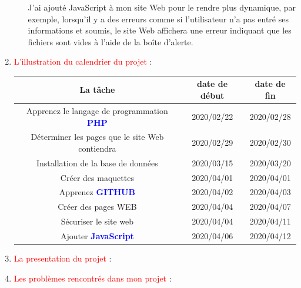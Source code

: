 \documentclass{article}
\begin{document}
\begin{enumerate}
\begin{enumerate}
         \vspace{0.4cm}
                \setlength{\parindent}{1cm} J'ai ajouté JavaScript à mon site Web pour le rendre plus dynamique, par exemple, lorsqu'il y a des erreurs comme si l'utilisateur n'a pas entré ses informations et soumis, le site Web affichera une erreur indiquant que les fichiers sont vides à l'aide de la boîte d'alerte.
         
         
   
    \end{enumerate}
   \item \textcolor{red}{\huge L'illustration du calendrier du projet} :  
   \vspace{1.2cm}
   
         \hspace*{-0.83in}
        \begin{tabular}{|c | c | c|}
        \hline
          La tâche & date de début & date de fin\\ 
        \hline
        Apprenez le langage de programmation \textcolor{blue}{\textbf{PHP}} & 2020/02/22 & 2020/02/28 \\ 
        \hline
        Déterminer les pages que le site Web contiendra & 2020/02/29 & 2020/02/30 \\ 
        \hline
        Installation de la base de données & 2020/03/15 & 2020/03/20\\
        \hline
        Créer des maquettes & 2020/04/01  & 2020/04/01\\
        \hline
        Apprenez \textcolor{blue}{\textbf{GITHUB}} & 2020/04/02  & 2020/04/03\\
        \hline
        Créer des pages WEB & 2020/04/04  & 2020/04/07\\
        \hline
        Sécuriser le site web & 2020/04/04  & 2020/04/11\\
        \hline
        Ajouter \textcolor{blue}{\textbf{JavaScript}} & 2020/04/06  & 2020/04/12
        \end{tabular}
        
   
   \item \textcolor{red}{\huge La presentation du projet} :  
   \vspace{1cm}
   

   \item \textcolor{red}{\huge Les problèmes rencontrés dans mon projet} :
   
  
\end{enumerate}
\end{document}
